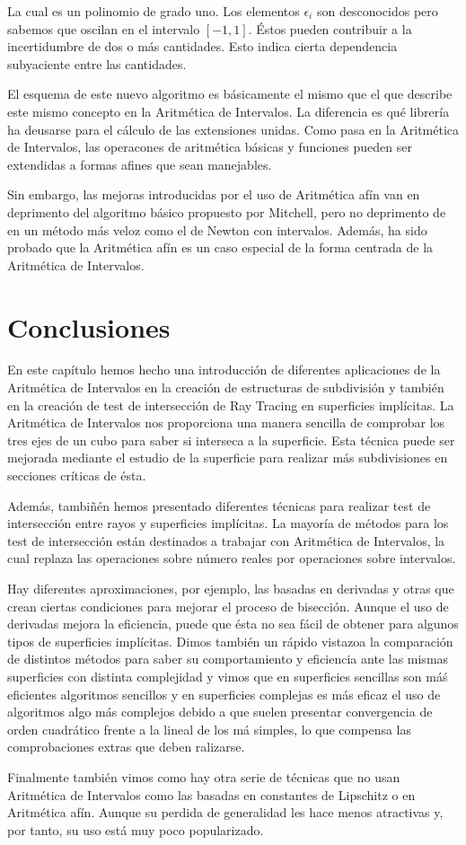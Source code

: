 La cual es un polinomio de grado uno. Los elementos $\epsilon_i$ son desconocidos pero sabemos que oscilan en el intervalo $[-1,1]$. Éstos pueden contribuir a la incertidumbre de dos o más cantidades. Esto indica cierta dependencia subyaciente entre las cantidades.
\par El esquema de este nuevo algoritmo es básicamente el mismo que el que describe este mismo concepto en la Aritmética de Intervalos. La diferencia es qué librería ha deusarse para el cálculo de las extensiones unidas. Como pasa en la Aritmética de Intervalos, las operacones de aritmética básicas y funciones pueden ser extendidas a formas afines que sean manejables. \cite{Stolfi97}
\par Sin embargo, las mejoras introducidas por el uso de Aritmética afín van en deprimento del algoritmo básico propuesto por Mitchell, \cite{Cusatis99} pero no deprimento de en un método más veloz como el de Newton con intervalos. Además, ha sido probado que la Aritmética afín es un caso especial de la forma centrada de la Aritmética de Intervalos. \cite{Gavriliu05}

\section{Conclusiones}

En este capítulo hemos hecho una introducción de diferentes aplicaciones de la Aritmética de Intervalos en la creación de estructuras de subdivisión y también en la creación de test de intersección de Ray Tracing en superficies implícitas. La Aritmética de Intervalos nos proporciona una manera sencilla de comprobar los tres ejes de un cubo para saber si interseca a la superficie. Esta técnica puede ser mejorada mediante el estudio de la superficie para realizar más subdivisiones en secciones críticas de ésta.
\par Además, tambiñén hemos presentado diferentes técnicas para realizar test de intersección entre rayos y superficies implícitas. La mayoría de métodos para los test de intersección están destinados a trabajar con Aritmética de Intervalos, la cual replaza las operaciones sobre número reales por operaciones sobre intervalos.
\par Hay diferentes aproximaciones, por ejemplo, las basadas en derivadas y otras que crean ciertas condiciones para mejorar el proceso de bisección. Aunque  el uso de derivadas mejora la eficiencia, puede que ésta no sea fácil de obtener para algunos tipos de superficies implícitas. Dimos también un rápido vistazoa la comparación de distintos métodos para saber su comportamiento y eficiencia ante las mismas superficies con distinta complejidad y vimos que en superficies sencillas son máś eficientes algoritmos sencillos y en superficies complejas es más eficaz el uso de algoritmos algo más complejos debido a que suelen presentar convergencia de orden cuadrático frente a la lineal de los má simples, lo que compensa las comprobaciones extras que deben ralizarse.
\par Finalmente también vimos como hay otra serie de técnicas que no usan Aritmética de Intervalos como las basadas en constantes de Lipschitz o en Aritmética afín. Aunque su perdida de generalidad les hace menos atractivas y, por tanto, su uso está muy poco popularizado.